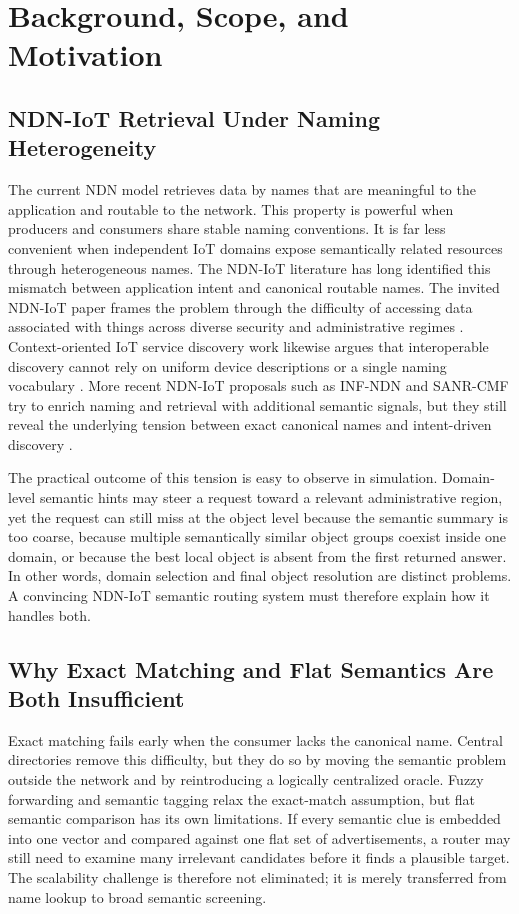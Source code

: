 \documentclass[journal]{IEEEtran}
\begin{document}
\section{Background, Scope, and Motivation}

\subsection{NDN-IoT Retrieval Under Naming Heterogeneity}

The current NDN model retrieves data by names that are meaningful to the application and routable to the network. This property is powerful when producers and consumers share stable naming conventions. It is far less convenient when independent IoT domains expose semantically related resources through heterogeneous names. The NDN-IoT literature has long identified this mismatch between application intent and canonical routable names. The invited NDN-IoT paper frames the problem through the difficulty of accessing data associated with things across diverse security and administrative regimes \cite{ndn_iot_invited}. Context-oriented IoT service discovery work likewise argues that interoperable discovery cannot rely on uniform device descriptions or a single naming vocabulary \cite{context_iot}. More recent NDN-IoT proposals such as INF-NDN and SANR-CMF try to enrich naming and retrieval with additional semantic signals, but they still reveal the underlying tension between exact canonical names and intent-driven discovery \cite{inf_ndn,sanr}.

The practical outcome of this tension is easy to observe in simulation. Domain-level semantic hints may steer a request toward a relevant administrative region, yet the request can still miss at the object level because the semantic summary is too coarse, because multiple semantically similar object groups coexist inside one domain, or because the best local object is absent from the first returned answer. In other words, domain selection and final object resolution are distinct problems. A convincing NDN-IoT semantic routing system must therefore explain how it handles both.

\subsection{Why Exact Matching and Flat Semantics Are Both Insufficient}

Exact matching fails early when the consumer lacks the canonical name. Central directories remove this difficulty, but they do so by moving the semantic problem outside the network and by reintroducing a logically centralized oracle. Fuzzy forwarding and semantic tagging relax the exact-match assumption, but flat semantic comparison has its own limitations. If every semantic clue is embedded into one vector and compared against one flat set of advertisements, a router may still need to examine many irrelevant candidates before it finds a plausible target. The scalability challenge is therefore not eliminated; it is merely transferred from name lookup to broad semantic screening.
\end{document}
